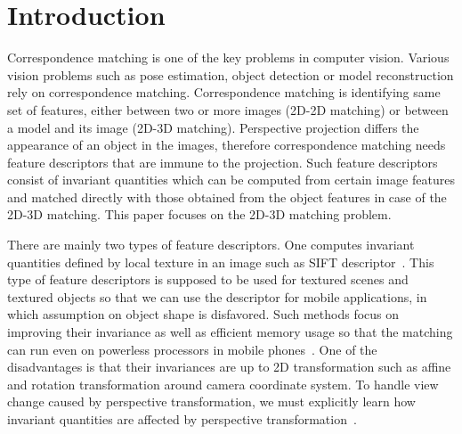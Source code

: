 \documentclass{bmvc2k}
\begin{document}
\section{Introduction}
\label{sec:intro}
Correspondence matching is one of the key problems in computer vision. 
Various vision problems such as pose estimation, object detection or model reconstruction rely on correspondence matching. 
Correspondence matching is identifying same set of features, either between two or more images (2D-2D matching) or between a model and its image (2D-3D matching).
Perspective projection differs the appearance of an object in the images, therefore correspondence matching needs feature descriptors that are immune to the projection.
Such feature descriptors consist of invariant quantities which can be computed from certain image features and matched directly with those obtained from the object features in case of the 2D-3D matching.
This paper focuses on the 2D-3D matching problem.

\par 
There are mainly two types of feature descriptors.
One computes invariant quantities defined by local texture in an image such as SIFT descriptor~\cite{Lowe1999}.
This type of feature descriptors is supposed to be used for textured scenes and textured objects so that we can use the descriptor for mobile applications, in which assumption on object shape is disfavored.
Such methods focus on improving their invariance as well as efficient memory usage so that the matching can run even on powerless processors in mobile phones~\cite{Ke2004,Calonder2010}.
One of the disadvantages is that their invariances are up to 2D transformation such as affine and rotation transformation around camera coordinate system.
To handle view change caused by perspective transformation, we must explicitly learn how invariant quantities are affected by perspective transformation~\cite{Kurz2012,Lepetit2006}. 
\end{document}
